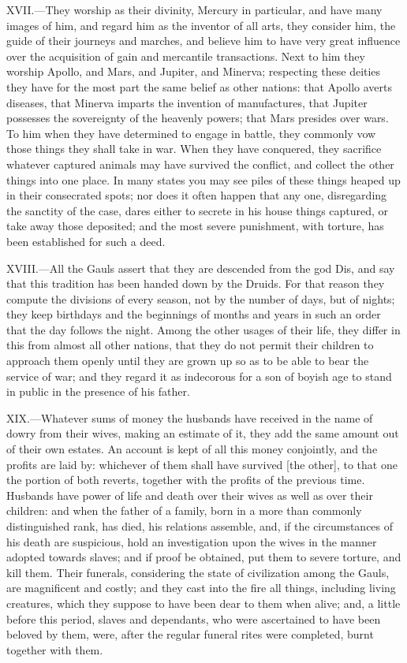 XVII.—They worship as their divinity, Mercury in particular, and have
many images of him, and regard him as the inventor of all arts, they
consider him, the guide of their journeys and marches, and believe him
to have very great influence over the acquisition of gain and mercantile
transactions. Next to him they worship Apollo, and Mars, and Jupiter,
and Minerva; respecting these deities they have for the most part the
same belief as other nations: that Apollo averts diseases, that Minerva
imparts the invention of manufactures, that Jupiter possesses the
sovereignty of the heavenly powers; that Mars presides over wars. To him
when they have determined to engage in battle, they commonly vow those
things they shall take in war. When they have conquered, they sacrifice
whatever captured animals may have survived the conflict, and collect
the other things into one place. In many states you may see piles of
these things heaped up in their consecrated spots; nor does it often
happen that any one, disregarding the sanctity of the case, dares either
to secrete in his house things captured, or take away those deposited;
and the most severe punishment, with torture, has been established for
such a deed.

XVIII.—All the Gauls assert that they are descended from the god Dis,
and say that this tradition has been handed down by the Druids. For that
reason they compute the divisions of every season, not by the number of
days, but of nights; they keep birthdays and the beginnings of months
and years in such an order that the day follows the night. Among the
other usages of their life, they differ in this from almost all other
nations, that they do not permit their children to approach them openly
until they are grown up so as to be able to bear the service of war; and
they regard it as indecorous for a son of boyish age to stand in public
in the presence of his father.

XIX.—Whatever sums of money the husbands have received in the name of
dowry from their wives, making an estimate of it, they add the same
amount out of their own estates. An account is kept of all this money
conjointly, and the profits are laid by: whichever of them shall have
survived [the other], to that one the portion of both reverts, together
with the profits of the previous time. Husbands have power of life and
death over their wives as well as over their children: and when the
father of a family, born in a more than commonly distinguished rank, has
died, his relations assemble, and, if the circumstances of his death are
suspicious, hold an investigation upon the wives in the manner adopted
towards slaves; and if proof be obtained, put them to severe torture,
and kill them. Their funerals, considering the state of civilization
among the Gauls, are magnificent and costly; and they cast into the fire
all things, including living creatures, which they suppose to have been
dear to them when alive; and, a little before this period, slaves and
dependants, who were ascertained to have been beloved by them, were,
after the regular funeral rites were completed, burnt together with
them.


